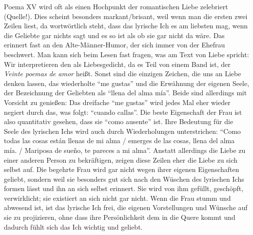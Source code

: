 Poema XV wird oft als einen Hochpunkt der romantischen Liebe zelebriert (Quelle!).
Dies scheint besonders markant/brisant, weil wenn man die ersten zwei Zeilen liest, da wortwörtlich steht, dass das lyrische Ich es am liebsten mag, wenn die Geliebte gar nichts sagt und es so ist als ob sie gar nicht da wäre.
Das erinnert fast an den Alte-Männer-Humor, der sich immer von der Ehefrau beschwert. %
Man kann sich beim Lesen fast fragen, was am Text von Liebe spricht:
Wir interpretieren den als Liebesgedicht, da es Teil von einem Band ist, der \textit{Veinte poemas de amor} heißt.
Sonst sind die einzigen Zeichen, die uns an Liebe denken lassen, das wiederholte ``me gustas'' und die Erwähnung der eigenen Seele, der Bezeichnung der Geliebten als ``llena del alma mía''.
Beide sind allerdings mit Vorsicht zu genießen:
Das dreifache ``me gustas'' wird jedes Mal eher wieder negiert durch das, was folgt: ``cuando callas''.
Die beste Eigenschaft der Frau ist also quantitativ gesehen, dass sie ``como ausente'' ist.
Ihre Bedeutung für die Seele des lyrischen Ichs wird auch durch Wiederholungen unterstrichen: ``Como todas las cosas están llenas de mi alma / emerges de las cosas, llena del alma mía. / Mariposa de sueño, te pareces a mi alma''.
Anstatt allerdings die Liebe zu einer anderen Person zu bekräftigen, zeigen diese Zeilen eher die Liebe zu sich selbst auf.
Die begehrte Frau wird gar nicht wegen ihrer eigenen Eigenschaften geliebt, sondern weil sie besonders gut sich nach den Wüschen des lyrischen Ichs formen lässt und ihn an sich selbst erinnert.
Sie wird von ihm gefüllt, geschöpft, verwirklicht; sie existiert an sich nicht gar nicht.
Wenn die Frau stumm und abwesend ist, ist das lyrische Ich frei, die eigenen Vorstellungen und Wünsche auf sie zu projizieren, ohne dass ihre Persönlichkeit dem in die Quere kommt und dadurch fühlt sich das Ich wichtig und geliebt.
